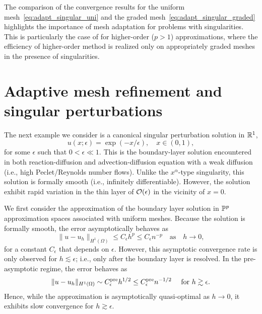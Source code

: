 The comparison of the convergence results for the uniform mesh~\eqref{eq:adapt_singular_uni} and the graded mesh~\eqref{eq:adapt_singular_graded} highlights the importance of mesh adaptation for problems with singularities.  This is particularly the case of for higher-order ($p > 1$) approximations, where the efficiency of higher-order method is realized only on appropriately graded meshes in the presence of singularities.


\section{Adaptive mesh refinement and singular perturbations}
The next example we consider is a canonical singular perturbation solution in $\mathbb{R}^1$,
\begin{equation*}
  u(x;\epsilon) = \exp(-x/\epsilon), \quad x \in (0,1),
\end{equation*}
for some $\epsilon$ such that $0 < \epsilon \ll 1$. This is the boundary-layer solution encountered in both reaction-diffusion and advection-diffusion equation with a weak diffusion (i.e., high Peclet/Reynolds number flows).  Unlike the $x^\alpha$-type singularity, this solution is formally smooth (i.e., infinitely differentiable).  However, the solution exhibit rapid variation in the thin layer of $\mathcal{O}(\epsilon)$ in the vicinity of $x = 0$.

We first consider the approximation of the boundary layer solution in $\mathbb{P}^p$ approximation spaces associated with uniform meshes. Because the solution is formally smooth, the error asymptotically behaves as
\begin{equation*}
  \| u - u_h \|_{H^1(\Omega)} \leq C_{\epsilon} h^p \leq C_{\epsilon} n^{-p} \quad \text{as} \quad h \to 0,
\end{equation*}
for a constant $C_\epsilon$ that depends on $\epsilon$. However, this asymptotic convergence rate is only observed for $h \lesssim \epsilon$; i.e., only after the boundary layer is resolved.  In the pre-asymptotic regime, the error behaves as
\begin{equation*}
  \| u - u_h \|_{H^1(\Omega)} \sim C^{\rm pre}_{\epsilon} h^{1/2} \leq C^{\rm pre}_\epsilon n^{-1/2} \quad \text{ for } h \gtrsim \epsilon .
\end{equation*}
Hence, while the approximation is asymptotically quasi-optimal as $h \to 0$, it exhibits slow convergence for $h \gtrsim \epsilon$.


